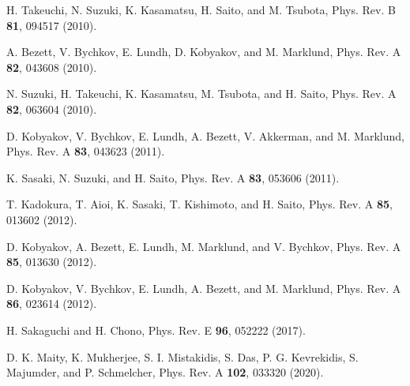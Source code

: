\documentclass[pra,aps,superscriptaddress,twocolumn,color]{revtex4-1}
\begin{document}
\begin{thebibliography}{99}
H. Takeuchi, N. Suzuki, K. Kasamatsu, H. Saito, and M. Tsubota,
Phys. Rev. B \textbf{81}, 094517 (2010).

A. Bezett, V. Bychkov, E. Lundh, D. Kobyakov, and M. Marklund,
Phys. Rev. A \textbf{82}, 043608 (2010).

N. Suzuki, H. Takeuchi, K. Kasamatsu, M. Tsubota, and H. Saito,
Phys. Rev. A \textbf{82}, 063604 (2010).

D. Kobyakov, V. Bychkov, E. Lundh, A. Bezett, V. Akkerman, and M. Marklund,
Phys. Rev. A \textbf{83}, 043623 (2011).

K. Sasaki, N. Suzuki, and H. Saito,
Phys. Rev. A \textbf{83}, 053606 (2011).

T. Kadokura, T. Aioi, K. Sasaki, T. Kishimoto, and H. Saito,
Phys. Rev. A \textbf{85}, 013602 (2012).

D. Kobyakov, A. Bezett, E. Lundh, M. Marklund, and V. Bychkov,
Phys. Rev. A \textbf{85}, 013630 (2012).

D. Kobyakov, V. Bychkov, E. Lundh, A. Bezett, and M. Marklund,
Phys. Rev. A \textbf{86}, 023614 (2012).

H. Sakaguchi and H. Chono,
Phys. Rev. E \textbf{96}, 052222 (2017).

D. K. Maity, K. Mukherjee, S. I. Mistakidis, S. Das, P. G. Kevrekidis,
S. Majumder, and P. Schmelcher,
Phys. Rev. A \textbf{102}, 033320 (2020).


\end{thebibliography}
\end{document}
